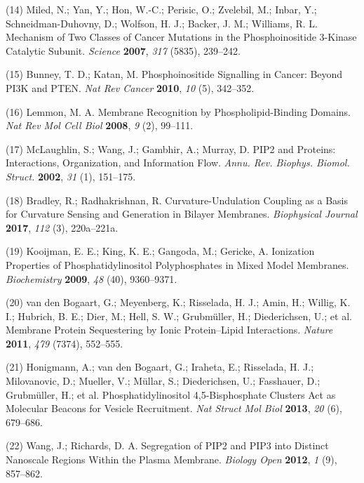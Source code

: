 \documentclass[11pt,notitlepage]{article}
\begin{document}
\leavevmode\hypertarget{ref-1HRoQaadQ}{}%
(14) Miled, N.; Yan, Y.; Hon, W.-C.; Perisic, O.; Zvelebil, M.; Inbar,
Y.; Schneidman-Duhovny, D.; Wolfson, H. J.; Backer, J. M.; Williams, R.
L. Mechanism of Two Classes of Cancer Mutations in the Phosphoinositide
3-Kinase Catalytic Subunit. \emph{Science} \textbf{2007}, \emph{317}
(5835), 239--242.

\leavevmode\hypertarget{ref-1DCzqvykg}{}%
(15) Bunney, T. D.; Katan, M. Phosphoinositide Signalling in Cancer:
Beyond PI3K and PTEN. \emph{Nat Rev Cancer} \textbf{2010}, \emph{10}
(5), 342--352.

\leavevmode\hypertarget{ref-uyKE7bWV}{}%
(16) Lemmon, M. A. Membrane Recognition by Phospholipid-Binding Domains.
\emph{Nat Rev Mol Cell Biol} \textbf{2008}, \emph{9} (2), 99--111.

\leavevmode\hypertarget{ref-3EmJ4esY}{}%
(17) McLaughlin, S.; Wang, J.; Gambhir, A.; Murray, D. PIP2 and
Proteins: Interactions, Organization, and Information Flow. \emph{Annu.
Rev. Biophys. Biomol. Struct.} \textbf{2002}, \emph{31} (1), 151--175.

\leavevmode\hypertarget{ref-5PUA7pLD}{}%
(18) Bradley, R.; Radhakrishnan, R. Curvature-Undulation Coupling as a
Basis for Curvature Sensing and Generation in Bilayer Membranes.
\emph{Biophysical Journal} \textbf{2017}, \emph{112} (3), 220a--221a.

\leavevmode\hypertarget{ref-8pFCG7HG}{}%
(19) Kooijman, E. E.; King, K. E.; Gangoda, M.; Gericke, A. Ionization
Properties of Phosphatidylinositol Polyphosphates in Mixed Model
Membranes. \emph{Biochemistry} \textbf{2009}, \emph{48} (40),
9360--9371.

\leavevmode\hypertarget{ref-U2YHSNKE}{}%
(20) van den Bogaart, G.; Meyenberg, K.; Risselada, H. J.; Amin, H.;
Willig, K. I.; Hubrich, B. E.; Dier, M.; Hell, S. W.; Grubmüller, H.;
Diederichsen, U.; et al. Membrane Protein Sequestering by Ionic
Protein--Lipid Interactions. \emph{Nature} \textbf{2011}, \emph{479}
(7374), 552--555.

\leavevmode\hypertarget{ref-Gw4f4Ayu}{}%
(21) Honigmann, A.; van den Bogaart, G.; Iraheta, E.; Risselada, H. J.;
Milovanovic, D.; Mueller, V.; Müllar, S.; Diederichsen, U.; Fasshauer,
D.; Grubmüller, H.; et al. Phosphatidylinositol 4,5-Bisphosphate
Clusters Act as Molecular Beacons for Vesicle Recruitment. \emph{Nat
Struct Mol Biol} \textbf{2013}, \emph{20} (6), 679--686.

\leavevmode\hypertarget{ref-rvpDeSHJ}{}%
(22) Wang, J.; Richards, D. A. Segregation of PIP2 and PIP3 into
Distinct Nanoscale Regions Within the Plasma Membrane. \emph{Biology
Open} \textbf{2012}, \emph{1} (9), 857--862.
\end{document}
